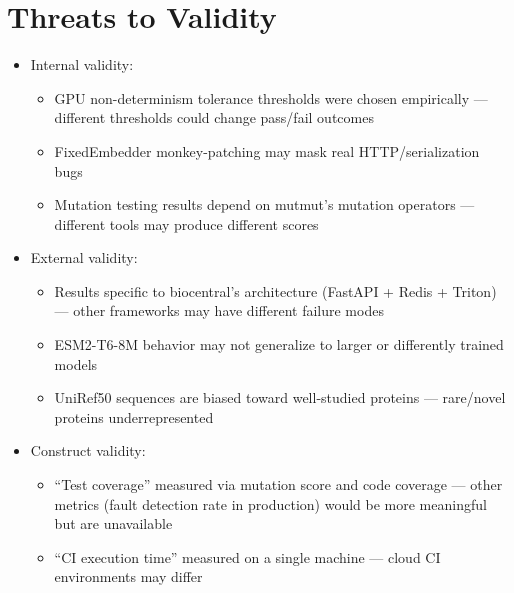 \section{Threats to Validity}\label{sec:threats}
\begin{itemize}
  \item Internal validity:
    \begin{itemize}
      \item GPU non-determinism tolerance thresholds were chosen empirically --- different thresholds could change pass/fail outcomes
      \item FixedEmbedder monkey-patching may mask real HTTP/serialization bugs
      \item Mutation testing results depend on mutmut's mutation operators --- different tools may produce different scores
    \end{itemize}
  \item External validity:
    \begin{itemize}
      \item Results specific to biocentral's architecture (FastAPI + Redis + Triton) --- other frameworks may have different failure modes
      \item ESM2-T6-8M behavior may not generalize to larger or differently trained models
      \item UniRef50 sequences are biased toward well-studied proteins --- rare/novel proteins underrepresented
    \end{itemize}
  \item Construct validity:
    \begin{itemize}
      \item ``Test coverage'' measured via mutation score and code coverage --- other metrics (fault detection rate in production) would be more meaningful but are unavailable
      \item ``CI execution time'' measured on a single machine --- cloud CI environments may differ
    \end{itemize}
\end{itemize}
